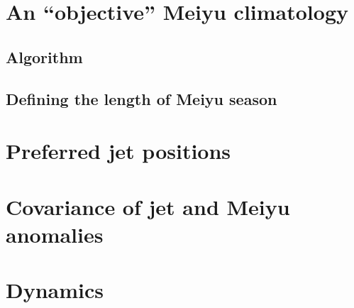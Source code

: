 \documentclass[draft,grl]{AGUTeX}
\begin{document}
\begin{article}
\section{An ``objective'' Meiyu climatology}
\subsection{Algorithm}
	
\subsection{Defining the length of Meiyu season}	
	
\section{Preferred jet positions}
	
\section{Covariance of jet and Meiyu anomalies}
	
\section{Dynamics}


\end{article}
\end{document}
